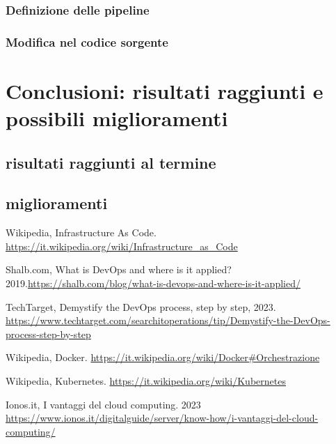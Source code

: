 \documentclass[a4paper,12pt]{report}
\begin{document}
\subsection{Definizione delle pipeline}
\subsection{Modifica nel codice sorgente}

\chapter{Conclusioni: risultati raggiunti e possibili miglioramenti}
\section{risultati raggiunti al termine}
\section{miglioramenti}

%
%
\begin{thebibliography}{00}
%
Wikipedia, Infrastructure As Code. \url{https://it.wikipedia.org/wiki/Infrastructure_as_Code}

Shalb.com, What is DevOps and where is it applied? 2019.\url{https://shalb.com/blog/what-is-devops-and-where-is-it-applied/}

TechTarget, Demystify the DevOps process, step by step, 2023. \url{https://www.techtarget.com/searchitoperations/tip/Demystify-the-DevOps-process-step-by-step}

Wikipedia, Docker. \url{https://it.wikipedia.org/wiki/Docker#Orchestrazione}

Wikipedia, Kubernetes. \url{https://it.wikipedia.org/wiki/Kubernetes}

Ionos.it, I vantaggi del cloud computing. 2023 \url{https://www.ionos.it/digitalguide/server/know-how/i-vantaggi-del-cloud-computing/}

%
%
\end{thebibliography}
% 
\end{document}
